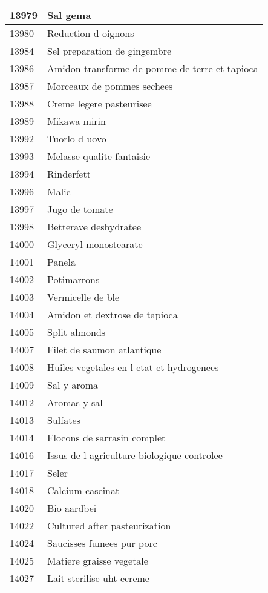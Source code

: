 \begin{longtable}{|l|l|}
13979 & Sal gema \\ \hline 
13980 & Reduction d oignons \\ \hline 
13984 & Sel preparation de gingembre \\ \hline 
13986 & Amidon transforme de pomme de terre et tapioca \\ \hline 
13987 & Morceaux de pommes sechees \\ \hline 
13988 & Creme legere pasteurisee \\ \hline 
13989 & Mikawa mirin \\ \hline 
13992 & Tuorlo d uovo \\ \hline 
13993 & Melasse qualite fantaisie \\ \hline 
13994 & Rinderfett \\ \hline 
13996 & Malic \\ \hline 
13997 & Jugo de tomate \\ \hline 
13998 & Betterave deshydratee \\ \hline 
14000 & Glyceryl monostearate \\ \hline 
14001 & Panela \\ \hline 
14002 & Potimarrons \\ \hline 
14003 & Vermicelle de ble \\ \hline 
14004 & Amidon et dextrose de tapioca \\ \hline 
14005 & Split almonds \\ \hline 
14007 & Filet de saumon atlantique \\ \hline 
14008 & Huiles vegetales en l etat et hydrogenees \\ \hline 
14009 & Sal y aroma \\ \hline 
14012 & Aromas y sal \\ \hline 
14013 & Sulfates \\ \hline 
14014 & Flocons de sarrasin complet \\ \hline 
14016 & Issus de l agriculture biologique controlee \\ \hline 
14017 & Seler \\ \hline 
14018 & Calcium caseinat \\ \hline 
14020 & Bio aardbei \\ \hline 
14022 & Cultured after pasteurization \\ \hline 
14024 & Saucisses fumees pur porc \\ \hline 
14025 & Matiere graisse vegetale \\ \hline 
14027 & Lait sterilise uht ecreme \\ \hline 

\end{longtable}
